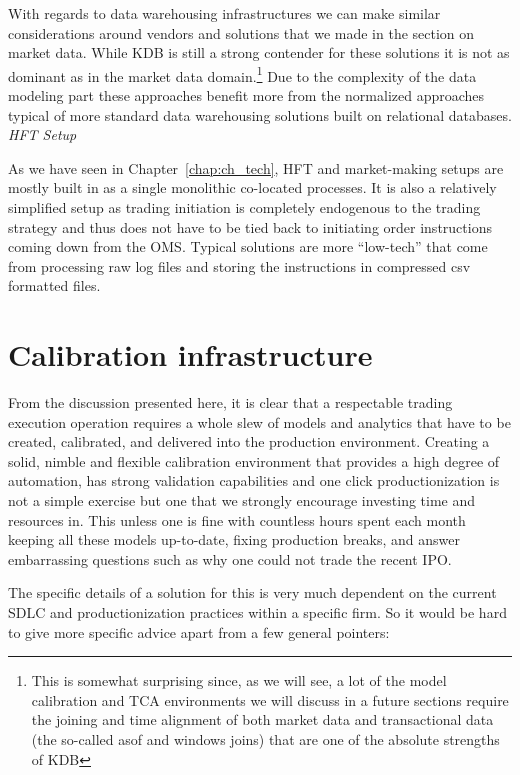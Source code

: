 With regards to data warehousing infrastructures we can make similar considerations around vendors and solutions that we made in the section on market data. While KDB is still a strong contender for these solutions it is not as dominant as in the market data domain.\footnote{This is somewhat surprising since, as we will see, a lot of the model calibration and TCA environments we will discuss in a future sections require the joining and time alignment of both market data and transactional data (the so-called asof and windows joins) that are one of the absolute strengths of KDB} Due to the  complexity of the data modeling part these approaches benefit more from the normalized approaches typical of more standard data warehousing solutions built on relational databases. \\


\noindent\emph{HFT Setup}


As we have seen in Chapter~\ref{chap:ch_tech}, HFT and market-making setups are mostly built in as a single monolithic co-located processes. It is also a relatively simplified setup as trading initiation is completely endogenous to the trading strategy and thus does not have to be tied back to initiating order instructions coming down from the OMS. Typical solutions are more ``low-tech'' that come from processing raw log files and storing the instructions in compressed csv formatted files.



\section{Calibration infrastructure}


From the discussion presented here, it is clear that a respectable trading execution operation requires a whole slew of models and analytics that have to be created, calibrated, and delivered into the production environment. Creating a solid, nimble and flexible calibration environment that provides a high degree of automation, has strong validation capabilities and one click productionization is not a simple exercise but one that we strongly encourage investing time and resources in. This unless one is fine with countless hours spent each month keeping all these models up-to-date, fixing production breaks, and answer embarrassing questions such as why one could not trade the recent IPO. 


The specific details of a solution for this is very much dependent on the current SDLC and productionization practices within a specific firm. So it would be hard to give more specific advice apart from a few general pointers:

